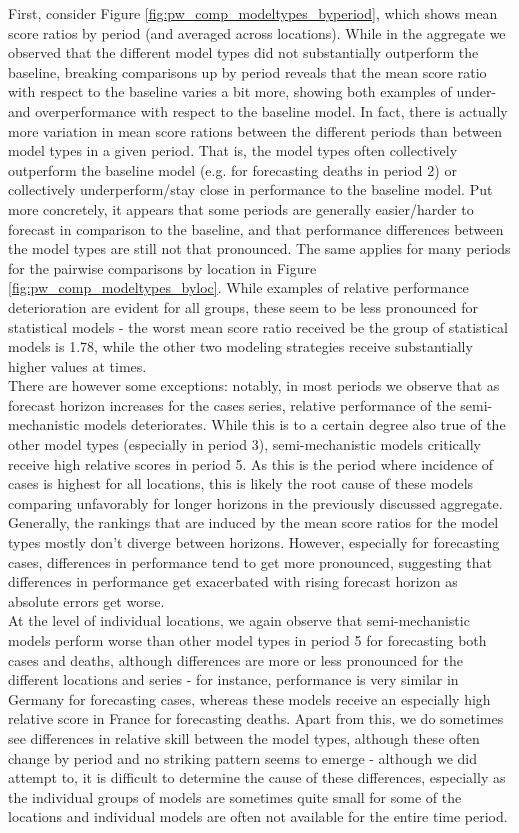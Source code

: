 First, consider Figure \ref{fig:pw_comp_modeltypes_byperiod}, which shows mean score ratios by period (and averaged across locations). While in the aggregate we observed that the different model types did not substantially outperform the baseline, breaking comparisons up by period reveals that the mean score ratio with respect to the baseline varies a bit more, showing both examples of under- and overperformance with respect to the baseline model. In fact, there is actually more variation in mean score rations between the different periods than between model types in a given period. That is, %
the model types often collectively outperform the baseline model (e.g. for forecasting deaths in period 2) or collectively underperform/stay close in performance to the baseline model. Put more concretely, it appears that some periods are generally easier/harder to forecast in comparison to the baseline, and that performance differences between the model types are still not that pronounced. The same applies for many periods for the pairwise comparisons by location in Figure \ref{fig:pw_comp_modeltypes_byloc}. While examples of relative performance deterioration are evident for all groups, these seem to be less pronounced for statistical models - the worst mean score ratio received be the group of statistical models is 1.78, while the other two modeling strategies receive substantially higher values at times.\\
There are however some exceptions: notably, in most periods we observe that as forecast horizon increases for the cases series, relative performance of the semi-mechanistic models deteriorates. While this is to a certain degree also true of the other model types (especially in period 3), semi-mechanistic models critically receive high relative scores in period 5. As this is the period where incidence of cases is highest for all locations, this is likely the root cause of these models comparing unfavorably for longer horizons in the previously discussed aggregate.\\
Generally, the rankings that are induced by the mean score ratios for the model types mostly don't diverge between horizons. However, especially for forecasting cases, differences in performance tend to get more pronounced, suggesting that differences in performance get exacerbated with rising forecast horizon as absolute errors get worse.\\
At the level of individual locations, we again observe that semi-mechanistic models perform worse than other model types in period 5 for forecasting both cases and deaths, although differences are more or less pronounced for the different locations and series - for instance, performance is very similar in Germany for forecasting cases, whereas these models receive an especially high relative score in France for forecasting deaths. Apart from this, we do sometimes see differences in relative skill between the model types, although these often change by period and no striking pattern seems to emerge - although we did attempt to, it is difficult to determine the cause of these differences, especially as the individual groups of models are sometimes quite small for some of the locations and individual models are often not available for the entire time period.\\
